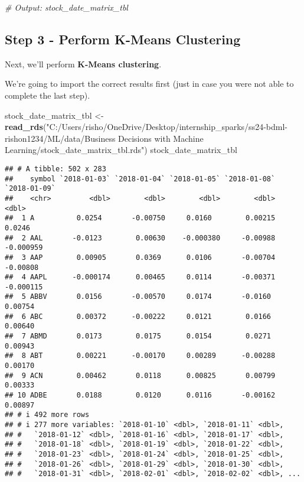 \documentclass[
]{article}
\newenvironment{Shaded}{\begin{snugshade}}{\end{snugshade}}
\newcommand{\CommentTok}[1]{\textcolor[rgb]{0.56,0.35,0.01}{\textit{#1}}}
\newcommand{\FunctionTok}[1]{\textcolor[rgb]{0.13,0.29,0.53}{\textbf{#1}}}
\newcommand{\NormalTok}[1]{#1}
\newcommand{\OtherTok}[1]{\textcolor[rgb]{0.56,0.35,0.01}{#1}}
\newcommand{\StringTok}[1]{\textcolor[rgb]{0.31,0.60,0.02}{#1}}
\begin{document}
\begin{Shaded}
\begin{Highlighting}[]
\CommentTok{\# Output: stock\_date\_matrix\_tbl}
\end{Highlighting}
\end{Shaded}

\hypertarget{step-3---perform-k-means-clustering}{%
\subsection{Step 3 - Perform K-Means
Clustering}\label{step-3---perform-k-means-clustering}}

Next, we'll perform \textbf{K-Means clustering}.

We're going to import the correct results first (just in case you were
not able to complete the last step).

\begin{Shaded}
\begin{Highlighting}[]
\NormalTok{stock\_date\_matrix\_tbl }\OtherTok{\textless{}{-}} \FunctionTok{read\_rds}\NormalTok{(}\StringTok{"C:/Users/risho/OneDrive/Desktop/internship\_sparks/ss24{-}bdml{-}rishon1234/ML/data/Business Decisions with Machine Learning/stock\_date\_matrix\_tbl.rds"}\NormalTok{)}
\NormalTok{stock\_date\_matrix\_tbl}
\end{Highlighting}
\end{Shaded}

\begin{verbatim}
## # A tibble: 502 x 283
##    symbol `2018-01-03` `2018-01-04` `2018-01-05` `2018-01-08` `2018-01-09`
##    <chr>         <dbl>        <dbl>        <dbl>        <dbl>        <dbl>
##  1 A          0.0254       -0.00750     0.0160        0.00215     0.0246  
##  2 AAL       -0.0123        0.00630    -0.000380     -0.00988    -0.000959
##  3 AAP        0.00905       0.0369      0.0106       -0.00704    -0.00808 
##  4 AAPL      -0.000174      0.00465     0.0114       -0.00371    -0.000115
##  5 ABBV       0.0156       -0.00570     0.0174       -0.0160      0.00754 
##  6 ABC        0.00372      -0.00222     0.0121        0.0166      0.00640 
##  7 ABMD       0.0173        0.0175      0.0154        0.0271      0.00943 
##  8 ABT        0.00221      -0.00170     0.00289      -0.00288     0.00170 
##  9 ACN        0.00462       0.0118      0.00825       0.00799     0.00333 
## 10 ADBE       0.0188        0.0120      0.0116       -0.00162     0.00897 
## # i 492 more rows
## # i 277 more variables: `2018-01-10` <dbl>, `2018-01-11` <dbl>,
## #   `2018-01-12` <dbl>, `2018-01-16` <dbl>, `2018-01-17` <dbl>,
## #   `2018-01-18` <dbl>, `2018-01-19` <dbl>, `2018-01-22` <dbl>,
## #   `2018-01-23` <dbl>, `2018-01-24` <dbl>, `2018-01-25` <dbl>,
## #   `2018-01-26` <dbl>, `2018-01-29` <dbl>, `2018-01-30` <dbl>,
## #   `2018-01-31` <dbl>, `2018-02-01` <dbl>, `2018-02-02` <dbl>, ...
\end{verbatim}
\end{document}
